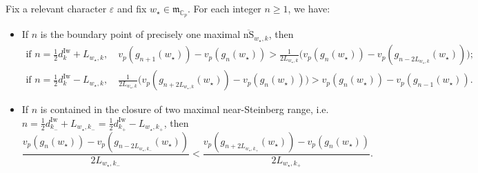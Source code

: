 \begin{proposition}
    \label{P:near-Steinberg-nonvertex-cd_part2}
    Fix a relevant character $\varepsilon$ and fix $w_\star \in {\mathfrak{m}}_{{\mathbb{C}}_p}$. For each integer $n\ge 1$, we have:
    \begin{itemize}
    \item[(c)] If $n$
    is the boundary point of  precisely one maximal $\overline {\mathrm{nS}}_{w_\star, k}$, then
    \begin{align*}
    \textrm{if } n = \tfrac 12 d_{k}^{\mathrm{Iw}}+ L_{w_\star, k}, \quad v_p(g_{n+1}(w_\star)) - v_p(g_n(w_\star)) >  \tfrac1{2L_{w_\star, k}}\big(v_p(g_n(w_\star)) - v_p(g_{n-2L_{w_\star, k}}(w_\star))\big);
    \\
    \textrm{if } n = \tfrac 12 d_{k}^{\mathrm{Iw}}- L_{w_\star, k}, \quad\tfrac1{2L_{w_\star, k}}\big(v_p(g_{n+2L_{w_\star, k}}(w_\star)) - v_p(g_{n}(w_\star))\big)> v_p(g_{n}(w_\star)) - v_p(g_{n-1}(w_\star)).
    \end{align*}
    \item[(d)] If $n$ is contained in the closure of two maximal near-Steinberg range, i.e. $n = \frac 12 d_{k_-}^{\mathrm{Iw}}+ L_{w_\star, k_-} = \frac 12 d_{k_+}^{\mathrm{Iw}}- L_{w_\star, k_+}$, then
    $$
    \frac{v_p(g_n(w_\star)) - v_p(g_{n-2L_{w_\star, k_-}}(w_\star))}{2L_{w_\star, k_-}} < \frac{v_p(g_{n+2L_{w_\star, k_+}}(w_\star))-v_p(g_n(w_\star)) }{2L_{w_\star, k_+}}.
    $$
    \end{itemize}
\end{proposition}

